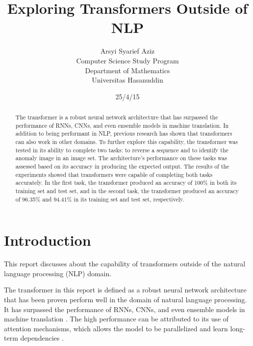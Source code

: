 \documentclass[peerreview]{IEEEtran}
\begin{document}
\title{Exploring Transformers Outside of NLP}



\author{Arsyi Syarief Aziz \\
Computer Science Study Program\\
Department of Mathematics\\
Universitas Hasanuddin\\
}
\date{25/4/15}

\maketitle
\tableofcontents
\listoffigures
\listoftables

\IEEEpeerreviewmaketitle
\begin{abstract}
The transformer is a robust neural network architecture that has surpassed the performance of RNNs, CNNs, and even ensemble models in machine translation. In addition to being performant in NLP, previous research has shown that transformers can also work in other domains. To further explore this capability, the transformer was tested in its ability to complete two tasks: to reverse a sequence and to identify the anomaly image in an image set. The architecture's performance on these tasks was assessed based on its accuracy in producing the expected output. The results of the experiments showed that transformers were capable of completing both tasks accurately. In the first task, the transformer produced an accuracy of 100\% in both its training set and test set, and in the second task, the transformer produced an accuracy of 96.35\% and 94.41\% in its training set and test set, respectively.

\end{abstract}

\section{Introduction}

This report discusses about the capability of transformers outside of the natural language processing (NLP) domain.

The transformer in this report is defined as a robust neural network architecture that has been proven perform well in the domain of natural language processing. It has surpassed the performance of RNNs, CNNs, and even ensemble models in machine translation 
\cite{vaswani_2017}. The high performance can be attributed to its use of attention mechanisms, which allows the model to be parallelized and learn long-term dependencies \cite{vaswani_2017}.
\end{document}
